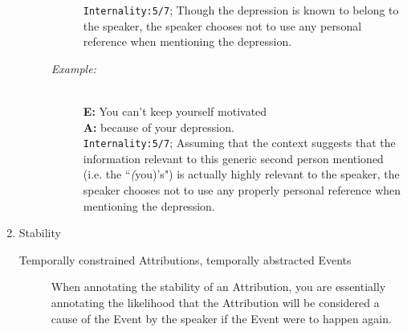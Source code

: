 \documentclass[a4paper,12pt]{article}
\begin{document}
\begin{enumerate}
\begin{description}
\begin{description}
                \texttt{Internality:5/7}; Though the depression is known to belong to the speaker, the speaker chooses not to use any personal reference when mentioning the depression.
                \end{description}
                \begin{description}
                \item[\emph{Example:}]\mbox{}\\
                \textbf{E:} You can't keep yourself motivated\\ 
                \textbf{A:} because of your depression.\\
                \texttt{Internality:5/7}; Assuming that the context suggests that the information relevant to this generic second person mentioned (i.e. the ``\emph(you)'s") is actually highly relevant to the speaker, the speaker chooses not to use any properly personal reference when mentioning the depression.
                \end{description}
        \end{description}

    \item Stability
        \begin{description}
            \item[Temporally constrained Attributions, temporally abstracted Events] When annotating the stability of an Attribution, you are essentially annotating the likelihood that the Attribution will be considered a cause of the Event by the speaker if the Event were to happen again.


\end{description}
\end{enumerate}
\end{document}
